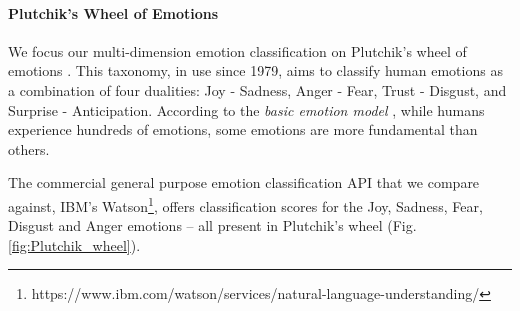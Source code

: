 \documentclass[letterpaper]{article} %
\begin{document}
\begin{table}[!bp]
\caption{Difficult video game tweets.}
\label{table:video-game-tweets}
\end{table}
\paragraph{Plutchik's Wheel of Emotions}
We focus our multi-dimension emotion classification on Plutchik's wheel of emotions \protect\cite{Plutchik1979}. This taxonomy, in use since 1979, aims to classify human emotions as a combination of four dualities: Joy - Sadness, Anger - Fear, Trust - Disgust, and Surprise - Anticipation. According to the \textit{basic emotion model} \protect\cite{Ekman2013AnAF}, while humans experience hundreds of emotions, some emotions are more fundamental than others. 

The commercial general purpose emotion classification API that we compare against, IBM's Watson\footnote{https://www.ibm.com/watson/services/natural-language-understanding/}, offers classification scores for the Joy, Sadness, Fear, Disgust and Anger emotions -- all present in Plutchik's wheel (Fig. \ref{fig:Plutchik_wheel}).
\end{document}
